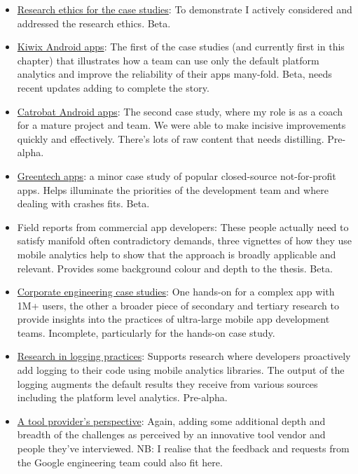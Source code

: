 \begin{itemize}
\begin{itemize}
        \item \href{section-research-ethics-for-the-case-studies}{Research ethics for the case studies}: To demonstrate I actively considered and addressed the research ethics. Beta.
        \item \href{section-kiwix-case-study}{Kiwix Android apps}: The first of the case studies (and currently first in this chapter) that illustrates how a team can use only the default platform analytics and improve the reliability of their apps many-fold. Beta, needs recent updates adding to complete the story.
        \item \href{section-catrobat-case-study}{Catrobat Android apps}: The second case study, where my role is as a coach for a mature project and team. We were able to make incisive improvements quickly and effectively. There's lots of raw content that needs distilling. Pre-alpha.
        \item \href{section-greentech-apps}{Greentech apps}: a minor case study of popular closed-source not-for-profit apps. Helps illuminate the priorities of the development team and where dealing with crashes fits. Beta.
        \item Field reports from commercial app developers: These people actually need to satisfy manifold often contradictory demands, three vignettes of how they use mobile analytics help to show that the approach is broadly applicable and relevant. Provides some background colour and depth to the thesis. Beta.
        \item \href{section-corporate-engineering-case-studies}{Corporate engineering case studies}: One hands-on for a complex app with 1M+ users, the other a broader piece of secondary and tertiary research to provide insights into the practices of ultra-large mobile app development teams. Incomplete, particularly for the hands-on case study. 
        \item \href{section-research-in-logging-practices}{Research in logging practices}: Supports research where developers proactively add logging to their code using mobile analytics libraries. The output of the logging augments the default results they receive from various sources including the platform level analytics. Pre-alpha. 
        \item \href{section-tool-providers-perspective}{A tool provider's perspective}: Again, adding some additional depth and breadth of the challenges as perceived by an innovative tool vendor and people they've interviewed. NB: I realise that the feedback and requests from the Google engineering team could also fit here.

\end{itemize}
\end{itemize}
